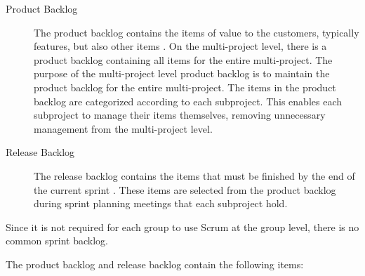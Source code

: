 \begin{description}
  \item[Product Backlog] The product backlog contains the items of value to the customers, typically features, but also other items \parencite{larman2003}. On the multi-project level, there is a product backlog containing all items for the entire multi-project. The purpose of the multi-project level product backlog is to maintain the product backlog for the entire multi-project. The items in the product backlog are categorized according to each subproject. This enables each subproject to manage their items themselves, removing unnecessary management from the multi-project level.
  \item[Release Backlog] The release backlog contains the items that must be finished by the end of the current sprint \parencite{larman2003}. These items are selected from the product backlog during sprint planning meetings that each subproject hold.
\end{description}

Since it is not required for each group to use Scrum at the group level, there is no common sprint backlog.

The product backlog and release backlog contain the following items:

